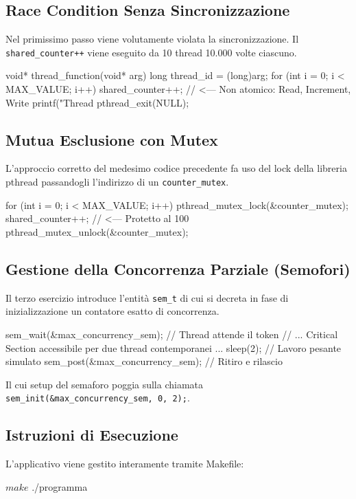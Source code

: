 \documentclass[a4paper,12pt]{article}
\begin{document}
\subsection{Race Condition Senza Sincronizzazione}
Nel primissimo passo viene volutamente violata la sincronizzazione. Il \texttt{shared\_counter++} viene eseguito da 10 thread 10.000 volte ciascuno.
\begin{ccode}
void* thread_function(void* arg) {
    long thread_id = (long)arg;
    for (int i = 0; i < MAX_VALUE; i++) {
        shared_counter++; // <--- Non atomico: Read, Increment, Write
    }
    printf("Thread %
    pthread_exit(NULL);
}
\end{ccode}

\subsection{Mutua Esclusione con Mutex}
L'approccio corretto del medesimo codice precedente fa uso del lock della libreria pthread passandogli l'indirizzo di un \texttt{counter\_mutex}.
\begin{ccode}
for (int i = 0; i < MAX_VALUE; i++) {
    pthread_mutex_lock(&counter_mutex);
    shared_counter++; // <--- Protetto al 100%
    pthread_mutex_unlock(&counter_mutex);
}
\end{ccode}

\subsection{Gestione della Concorrenza Parziale (Semofori)}
Il terzo esercizio introduce l'entità \texttt{sem\_t} di cui si decreta in fase di inizializzazione un contatore esatto di concorrenza.
\begin{ccode}
sem_wait(&max_concurrency_sem); // Thread attende il token
// ... Critical Section accessibile per due thread contemporanei ...
sleep(2); // Lavoro pesante simulato
sem_post(&max_concurrency_sem); // Ritiro e rilascio
\end{ccode}
Il cui setup del semaforo poggia sulla chiamata \texttt{sem\_init(\&max\_concurrency\_sem, 0, 2);}.


\subsection{Istruzioni di Esecuzione}
L'applicativo viene gestito interamente tramite Makefile:
\begin{terminal}
$ make
$ ./programma
\end{terminal}
\end{document}
